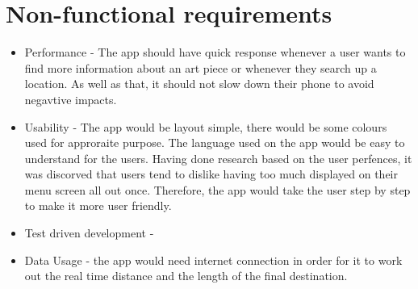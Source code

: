 \section{Non-functional requirements}
\begin{itemize}
        \item Performance -  The app should have quick response whenever a user wants to find more information about an art piece or whenever they search up a location. As well as that, it should not slow down their phone to avoid negavtive impacts.
        \item Usability - The app would be layout simple, there would be some colours used for approraite purpose. The language used on the app would be easy to understand for the users. Having done research based on the user perfences, it was discorved that users tend to dislike having too much displayed on their menu screen all out once. Therefore, the app would take the user step by step to make it more user friendly.
        \item Test driven development - 
        \item Data Usage - the app would need internet connection in order for it to work out the real time distance and the length of the final destination.
\end{itemize}
    

